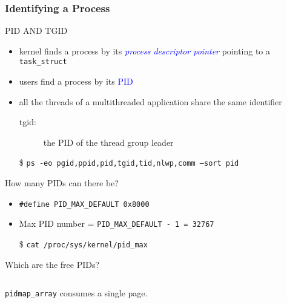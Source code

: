 \subsubsection{Identifying a Process}

\begin{frame}{PID AND TGID}
  \begin{itemize}
  \item kernel finds a process by its \textcolor{blue}{\emph{process descriptor pointer}}
    pointing to a \texttt{task\_struct}
  \item users find a process by its \textcolor{blue}{PID}
  \item all the threads of a multithreaded application share the same identifier
    \begin{description}
    \item[tgid:] the PID of the thread group leader
    \end{description}
  \end{itemize}
  \begin{center}
  \end{center}
  \begin{itemize}
  \item[\$] \texttt{ps -eo pgid,ppid,pid,tgid,tid,nlwp,comm --sort pid}
  \end{itemize}
\end{frame}


\begin{frame}[fragile=singleslide]
  \begin{block}{How many PIDs can there be?}
    \begin{itemize}
    \item \texttt{#define PID_MAX_DEFAULT 0x8000}
    \item Max PID number = \texttt{PID\_MAX\_DEFAULT - 1 = 32767}
    \item[\$] \texttt{cat /proc/sys/kernel/pid_max}
    \end{itemize}
  \end{block}
  \begin{block}{Which are the free PIDs?}
    \begin{center}
      \inputminted{c}{../figs/pidmap-array.c}
    \end{center}
    \texttt{pidmap\_array} consumes a single page.
  \end{block}
\end{frame}

